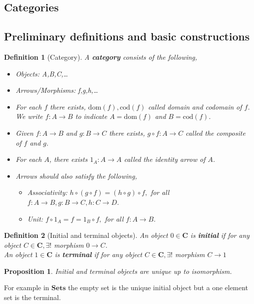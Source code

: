 \documentclass[12pt]{article}
\numberwithin{equation}{section}
\newtheorem{definition}{Definition}[section]
\newtheorem{proposition}{Proposition}[section]
\begin{document}
	\clearpage
	\begin{appendices}
		\section{Categories}
		\subsection{Preliminary definitions and basic constructions}
		\begin{definition}[Category]
			A \textbf{category} consists of the following,
			\begin{itemize}
				\item Objects: A,B,C,\dots
				\item Arrows/Morphisms: f,g,h,\dots
				\item For each $ f $ there exists, $ \mathrm{dom}(f) , \mathrm{cod}(f)$ called domain and codomain of $ f $. We write $ f: A \to B $ to indicate $ A=\mathrm{dom}(f) $ and $ B=\mathrm{cod}(f) $.
				\item Given  $ f: A \to B$ and $ g: B \to C $ there exists, $ g \circ f: A \to C $ called the \textit{composite} of $ f $ and $ g $.
				\item For each $ A $, there exists $ 1_A:A\to A $ called the \textit{identity arrow} of $ A $.
				\item Arrows should also satisfy the following,
				\begin{itemize}
					\item Associativity: $ h \circ(g \circ f) = (h \circ g) \circ f,$ for all $ f:A \to B, g:B \to C, h: C \to D $.
					\item Unit: $ f\circ 1_A=f=1_B\circ f, $ for all $ f:A \to B $.	
				\end{itemize}
			\end{itemize}
		\end{definition}
		
		\begin{definition}[Initial and terminal objects]
			An object $ 0 \in \mathbf{C} $ is \textbf{initial} if for any object $ C \in \mathbf{C}, \exists!$ morphism $ 0 \to C $.\\
			An object $ 1 \in \mathbf{C} $ is \textbf{terminal} if for any object $ C \in \mathbf{C}, \exists!$ morphism $ C \to 1 $
		\end{definition}
		\begin{proposition}
			Initial and terminal objects are unique up to isomorphism.
		\end{proposition}
		For example in $\mathbf{Sets}$ the empty set is the unique initial object but a one element set is the terminal.
		

\end{appendices}
\end{document}
